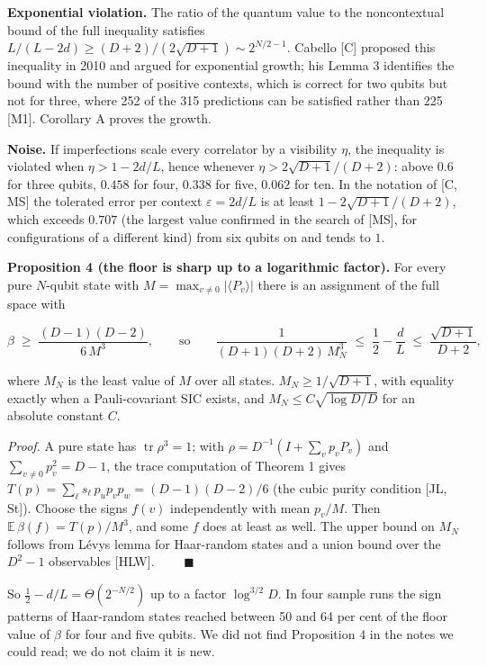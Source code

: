 \documentclass[11pt,a4paper]{article}
\newcommand{\gt}{>}
\begin{document}
\textbf{Exponential violation.} The ratio of the quantum value to the noncontextual bound of the full
inequality satisfies \(L/(L-2d) \ge (D+2)/(2\sqrt{D+1}) \sim 2^{N/2-1}\). Cabello {[}C{]} proposed this
inequality in 2010 and argued for exponential growth; his Lemma 3 identifies the bound with the number
of positive contexts, which is correct for two qubits but not for three, where 252 of the 315
predictions can be satisfied rather than 225 {[}M1{]}. Corollary A proves the growth.

\textbf{Noise.} If imperfections scale every correlator by a visibility \(\eta\), the inequality is violated
when \(\eta \gt 1 - 2d/L\), hence whenever \(\eta \gt 2\sqrt{D+1}/(D+2)\): above \(0.6\) for three qubits, \(0.458\)
for four, \(0.338\) for five, \(0.062\) for ten. In the notation of {[}C, MS{]} the tolerated error per context
\(\varepsilon = 2d/L\) is at least \(1 - 2\sqrt{D+1}/(D+2)\), which exceeds \(0.707\) (the largest value
confirmed in the search of {[}MS{]}, for configurations of a different kind) from six qubits on and tends
to \(1\).

\textbf{Proposition 4 (the floor is sharp up to a logarithmic factor).} For every pure \(N\)-qubit state with
\(M = \max_{v \ne 0} |\langle P_v \rangle|\) there is an assignment of the full space with

\[\beta \;\ge\; \frac{(D-1)(D-2)}{6\,M^3}, \qquad\text{so}\qquad
\frac{1}{(D+1)(D+2)\,M_N^3} \;\le\; \frac12 - \frac{d}{L} \;\le\; \frac{\sqrt{D+1}}{D+2},\]

where \(M_N\) is the least value of \(M\) over all states. \(M_N \ge 1/\sqrt{D+1}\), with equality exactly when a
Pauli-covariant SIC exists, and \(M_N \le C\sqrt{\log D / D}\) for an absolute constant \(C\).

\emph{Proof.} A pure state has \(\operatorname{tr}\rho^3 = 1\); with \(\rho = D^{-1}(I + \sum_v p_v P_v)\) and
\(\sum_{v\ne 0} p_v^2 = D-1\), the trace computation of Theorem 1 gives
\(T(p) = \sum_\ell s_\ell\, p_u p_v p_w = (D-1)(D-2)/6\) (the cubic purity condition {[}JL, St{]}). Choose the
signs \(f(v)\) independently with mean \(p_v/M\). Then \(\mathbb{E}\,\beta(f) = T(p)/M^3\), and some \(f\) does at
least as well. The upper bound on \(M_N\) follows from Lévy\textquotesingle s lemma for Haar-random states and a union
bound over the \(D^2-1\) observables {[}HLW{]}. \(\qquad\blacksquare\)

So \(\tfrac12 - d/L = \Theta(2^{-N/2})\) up to a factor \(\log^{3/2} D\). In four sample runs the sign patterns
of Haar-random states reached between 50 and 64 per cent of the floor value of \(\beta\) for four and five qubits.
We did not find Proposition 4 in the notes we could read; we do not claim it is new.
\end{document}
